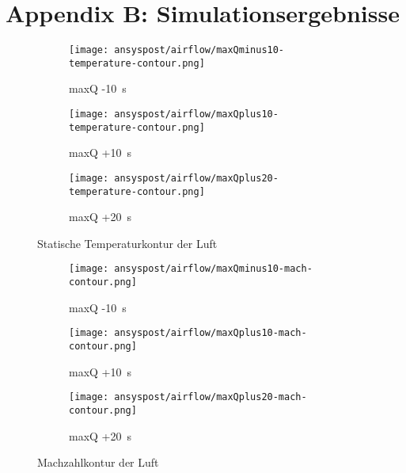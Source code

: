 \section*{Appendix B: Simulationsergebnisse}\label{Anh:simulation}

\begin{figure}[H]
    \centering

    \begin{subfigure}{\textwidth}
        \centering
        \texttt{[image: ansyspost/airflow/maxQminus10-temperature-contour.png]}
        \caption{maxQ -\SI{10}{\second}}
        \label{fig:maxQminus10_temp_contour}
    \end{subfigure}

    \begin{subfigure}{\textwidth}
        \centering
        \texttt{[image: ansyspost/airflow/maxQplus10-temperature-contour.png]}
        \caption{maxQ +\SI{10}{\second}}
        \label{fig:maxQplus10_temp_contour}
    \end{subfigure}

    \begin{subfigure}{\textwidth}
        \centering
        \texttt{[image: ansyspost/airflow/maxQplus20-temperature-contour.png]}
        \caption{maxQ +\SI{20}{\second}}
        \label{fig:maxQplus20_temp_contour}
    \end{subfigure}

    \caption{Statische Temperaturkontur der Luft}
    \label{fig:airflow_temp_contour_continued}
\end{figure}

\begin{figure}[H]
    \centering

    \begin{subfigure}{\textwidth}
        \centering
        \texttt{[image: ansyspost/airflow/maxQminus10-mach-contour.png]}
        \caption{maxQ -\SI{10}{\second}}
        \label{fig:maxQminus10_mach_contour}
    \end{subfigure}

    \begin{subfigure}{\textwidth}
        \centering
        \texttt{[image: ansyspost/airflow/maxQplus10-mach-contour.png]}
        \caption{maxQ +\SI{10}{\second}}
        \label{fig:maxQplus10_mach_contour}
    \end{subfigure}

    \begin{subfigure}{\textwidth}
        \centering
        \texttt{[image: ansyspost/airflow/maxQplus20-mach-contour.png]}
        \caption{maxQ +\SI{20}{\second}}
        \label{fig:maxQplus20_mach_contour}
    \end{subfigure}

    \caption{Machzahlkontur der Luft}
    \label{fig:airflow_mach_contour_continued}
\end{figure}

